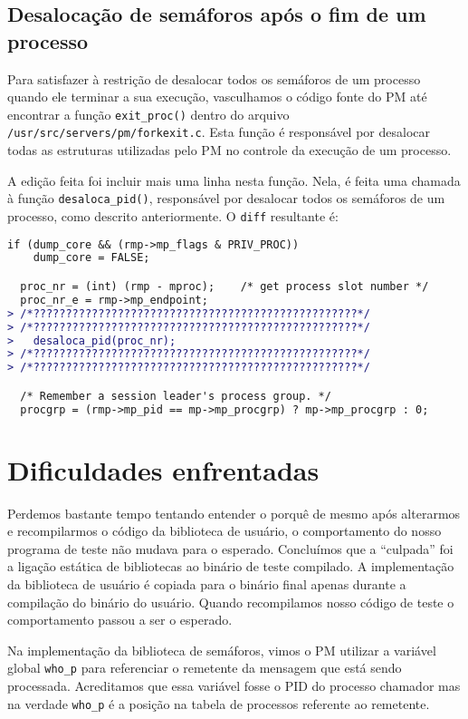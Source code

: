 \documentclass[brazil, a4paper]{scrartcl}
\begin{document}
\subsection{Desalocação de semáforos após o fim de um processo}
Para satisfazer à restrição de desalocar todos os semáforos de um processo quando
ele terminar a sua execução, vasculhamos o código fonte do PM até encontrar a
função \texttt{exit\_proc()} dentro do arquivo
\texttt{/usr/src/servers/pm/forkexit.c}. Esta função é responsável por desalocar
todas as estruturas utilizadas pelo PM no controle da execução de um processo.

A edição feita foi incluir mais uma linha nesta função. Nela, é feita uma
chamada à função \texttt{desaloca\_pid()}, responsável por desalocar todos os
semáforos de um processo, como descrito anteriormente. O \texttt{diff} resultante
é:

\begin{lstlisting}[language=diff]
  if (dump_core && (rmp->mp_flags & PRIV_PROC))
	dump_core = FALSE;

  proc_nr = (int) (rmp - mproc);	/* get process slot number */
  proc_nr_e = rmp->mp_endpoint;
> /*??????????????????????????????????????????????????*/
> /*??????????????????????????????????????????????????*/
>   desaloca_pid(proc_nr);
> /*??????????????????????????????????????????????????*/
> /*??????????????????????????????????????????????????*/

  /* Remember a session leader's process group. */
  procgrp = (rmp->mp_pid == mp->mp_procgrp) ? mp->mp_procgrp : 0;
\end{lstlisting}

\section{Dificuldades enfrentadas}
Perdemos bastante tempo tentando entender o porquê de mesmo após alterarmos
e recompilarmos o código da biblioteca de usuário, o comportamento do nosso
programa de teste não mudava para o esperado. Concluímos que a ``culpada'' foi
a ligação estática de bibliotecas ao binário de teste compilado. A implementação
da biblioteca de usuário é copiada para o binário final apenas durante a
compilação do binário do usuário. Quando recompilamos nosso código de teste
o comportamento passou a ser o esperado.

Na implementação da biblioteca de semáforos, vimos o PM utilizar a variável
global \texttt{who\_p} para referenciar o remetente da mensagem que está sendo
processada. Acreditamos que essa variável fosse o PID do processo chamador mas
na verdade \texttt{who\_p} é a posição na tabela de processos referente ao
remetente.
\end{document}

